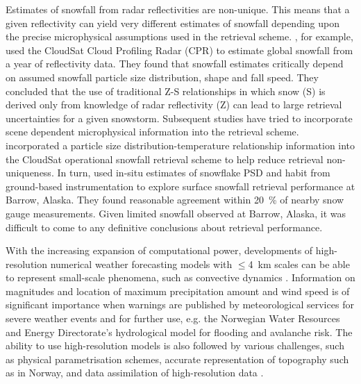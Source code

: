 Estimates of snowfall from radar reflectivities are non-unique.  This means that a given reflectivity can yield very different estimates of snowfall depending upon the precise microphysical assumptions used in the retrieval scheme. \citet{kulie_utilizing_2009}, for example, used the CloudSat Cloud Profiling Radar (CPR) to estimate global snowfall from a year of reflectivity data. They found that snowfall estimates critically depend on assumed snowfall particle size distribution, shape and fall speed.  They concluded that the use of traditional Z-S relationships in which snow (S) is derived only from knowledge of radar reflectivity (Z) can lead to large retrieval uncertainties for a given snowstorm.  Subsequent studies have tried to incorporate scene dependent microphysical information into the retrieval scheme. \citet{wood_estimation_2011} incorporated a particle size distribution-temperature relationship information into the CloudSat operational snowfall retrieval scheme to help reduce retrieval non-uniqueness.  In turn, \citet{cooper_variational_2017} used in-situ estimates of snowflake PSD and habit from ground-based instrumentation to explore surface snowfall retrieval performance at Barrow, Alaska. They found reasonable agreement within \SI{20}{\percent} of nearby snow gauge measurements. Given limited snowfall observed at Barrow, Alaska, it was difficult to come to any definitive conclusions about retrieval performance.
\par\medskip
\noindent
With the increasing expansion of computational power, developments of high-resolution numerical weather forecasting models with $\le$\SI{4}{\km} scales can be able to represent small-scale phenomena, such as convective dynamics \citep{gowan_validation_2018}. 
Information on magnitudes and location of maximum precipitation amount and wind speed is of significant importance when warnings are published by meteorological services for severe weather events and for further use, e.g. the Norwegian Water Resources and Energy Directorate's hydrological model for flooding and avalanche risk.
The ability to use high-resolution models is also followed by various challenges, such as physical parametrisation schemes, accurate representation of topography such as in Norway, and data assimilation of high-resolution data \citep{sun_convective-scale_2005}. 
